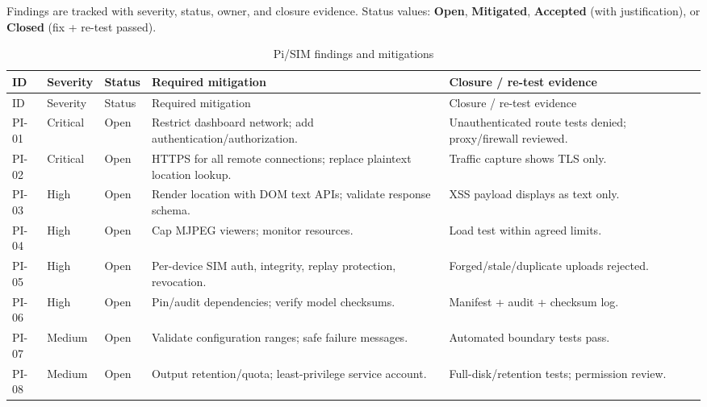 \documentclass[12pt]{article}
\newcommand{\toprule}{\hline}
\newcommand{\midrule}{\hline}
\newcommand{\bottomrule}{\hline}
\begin{document}
Findings are tracked with severity, status, owner, and closure evidence. Status
values: \textbf{Open}, \textbf{Mitigated}, \textbf{Accepted} (with
justification), or \textbf{Closed} (fix + re-test passed).

\begin{longtable}{p{}p{}p{}p{}p{}}
\caption{Pi/SIM findings and mitigations}\label{tab:mitigations}\\
\toprule
ID & Severity & Status & Required mitigation & Closure / re-test evidence \\
\midrule
\endfirsthead
\toprule
ID & Severity & Status & Required mitigation & Closure / re-test evidence \\
\midrule
\endhead
PI-01 & Critical & Open & Restrict dashboard network; add authentication/authorization. & Unauthenticated route tests denied; proxy/firewall reviewed. \\
PI-02 & Critical & Open & HTTPS for all remote connections; replace plaintext location lookup. & Traffic capture shows TLS only. \\
PI-03 & High & Open & Render location with DOM text APIs; validate response schema. & XSS payload displays as text only. \\
PI-04 & High & Open & Cap MJPEG viewers; monitor resources. & Load test within agreed limits. \\
PI-05 & High & Open & Per-device SIM auth, integrity, replay protection, revocation. & Forged/stale/duplicate uploads rejected. \\
PI-06 & High & Open & Pin/audit dependencies; verify model checksums. & Manifest + audit + checksum log. \\
PI-07 & Medium & Open & Validate configuration ranges; safe failure messages. & Automated boundary tests pass. \\
PI-08 & Medium & Open & Output retention/quota; least-privilege service account. & Full-disk/retention tests; permission review. \\
\bottomrule
\end{longtable}
\end{document}
